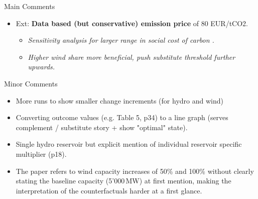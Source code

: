 \documentclass[10pt, aspectratio=169]{beamer}
\begin{document}
\begin{frame}{Main Comments}
\begin{itemize}
    \item Ext: \textbf{Data based (but conservative) emission price} of 80 EUR/tCO2. 
    \begin{itemize}
        \item \textit{Sensitivity analysis for larger range in social cost of carbon . }
        \item \textit{Higher wind share more beneficial, push substitute threshold further upwards.}
    \end{itemize}
\end{itemize}
\end{frame}

\begin{frame}{Minor Comments}
\begin{itemize}
    \item More runs to show smaller change increments (for hydro and wind)
    \item Converting outcome values (e.g. Table 5, p34) to a line graph (serves complement / substitute story + show "optimal" state).
    \item Single hydro reservoir but explicit mention of individual reservoir specific multiplier (p18).
    \item The paper refers to wind capacity increases of 50\% and 100\% without clearly stating the baseline capacity (5'000\,MW) at first mention, making the interpretation of the counterfactuals harder at a first glance. 
\end{itemize}
\end{frame}

\end{document}
